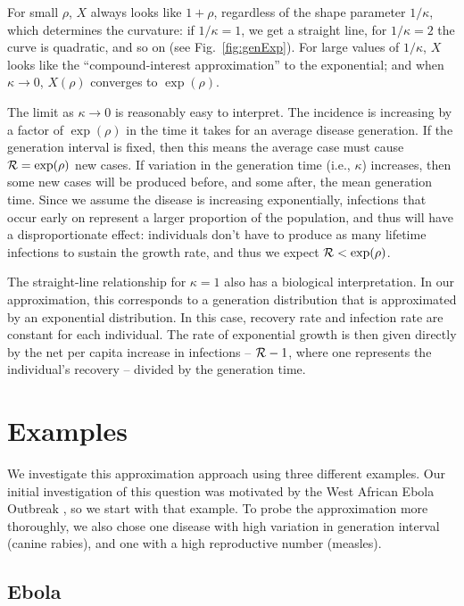 \documentclass[12pt,]{article}
\newcommand{\RR}{\ensuremath{{\cal R}}}
\newcommand{\fref}[1]{Fig.~\ref{fig:#1}}
\begin{document}
For small $\rho$, $X$ always looks like $1+\rho$, regardless of the shape parameter $1/\kappa$, which determines the curvature: if $1/\kappa = 1$, we get a straight line, for $1/\kappa=2$ the curve is quadratic, and so on (see \fref{genExp}).
For large values of $1/\kappa$, $X$ looks like the ``compound-interest approximation'' to the exponential; and when $\kappa \to 0$, $X(\rho)$ converges to $\exp(\rho)$.

The limit as $\kappa\to 0$ is reasonably easy to interpret. The incidence is increasing by a factor of $\exp(\rho)$ in the time it takes for an average disease generation. If the generation interval is fixed, then this means the average case must cause $\RR = \exp(\rho)$ new cases.
If variation in the generation time (i.e., $\kappa$) increases, then some new cases will be produced before, and some after, the mean generation time.
Since we assume the disease is increasing exponentially, infections that occur early on represent a larger proportion of the population, and thus will have a disproportionate effect: individuals don't have to produce as many lifetime infections to sustain the growth rate, and thus we expect  $\RR < \exp(\rho)$.

The straight-line relationship for $\kappa=1$ also has a biological interpretation. 
In our approximation, this corresponds to a generation distribution that is approximated by an exponential distribution. 
In this case, recovery rate and infection rate are constant for each individual.
The rate of exponential growth is then given directly by the net per capita increase in infections -- $\RR-1$, where one represents the individual's recovery -- divided by the generation time.

\section{Examples}

We investigate this approximation approach using three different examples. Our initial investigation of this question was motivated by the West African Ebola Outbreak \cite{WeitDush15}, so we start with that example. To probe the approximation more thoroughly, we also chose one disease with high variation in generation interval (canine rabies), and one with a high reproductive number (measles).

\subsection{Ebola}
\end{document}
